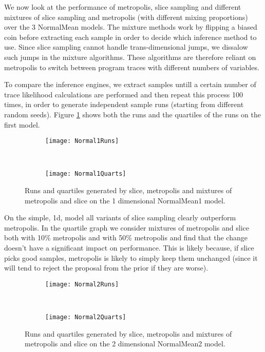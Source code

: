We now look at the performance of metropolis, slice sampling and different mixtures of slice sampling and metropolis (with different mixing proportions) over the 3 NormalMean models. The mixture methods work by flipping a biased coin before extracting each sample in order to decide which inference method to use. Since slice sampling cannot handle trans-dimensional jumps, we dissalow such jumps in the mixture algorithms. These algorithms are therefore reliant on metropolis to switch between program traces with different numbers of variables. 

To compare the inference engines, we extract samples untill a certain number of trace likelihood calculations are performed and then repeat this process 100 times, in order to generate independent sample runs (starting from different random seeds). Figure \ref{fig:normal1Perf} shows both the runs and the quartiles of the runs on the first model.

\begin{figure}[h]
        \centering
        \begin{subfigure}[b]{0.48\textwidth}
                \centering
                \texttt{[image: Normal1Runs]}
        \end{subfigure}
        ~ 
        \begin{subfigure}[b]{0.48\textwidth}
                \centering
                \texttt{[image: Normal1Quarts]}
        \end{subfigure}
    \caption{Runs and quartiles generated by slice, metropolis and mixtures of metropolis and slice on the 1 dimensional NormalMean1 model.}
    \label{fig:normal1Perf}
\end{figure}

On the simple, 1d, model all variants of slice sampling clearly outperform metropolis. In the quartile graph we consider mixtures of metropolis and slice both with 10\% metropolis and with 50\% metropolis and find that the change doesn't have a significant impact on performance. This is likely because, if slice picks good samples, metropolis is likely to simply keep them unchanged (since it will tend to reject the proposal from the prior if they are worse).

\begin{figure}[h]
        \centering
        \begin{subfigure}[b]{0.48\textwidth}
                \centering
                \texttt{[image: Normal2Runs]}
        \end{subfigure}
        ~ 
        \begin{subfigure}[b]{0.48\textwidth}
                \centering
                \texttt{[image: Normal2Quarts]}
        \end{subfigure}
    \caption{Runs and quartiles generated by slice, metropolis and mixtures of metropolis and slice on the 2 dimensional NormalMean2 model.}
    \label{fig:normal2Perf}
\end{figure}

